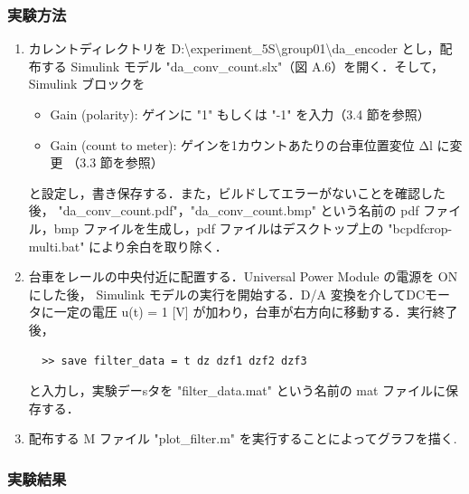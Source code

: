 \subsubsection{実験方法}
\begin{enumerate}
  \item カレントディレクトリを D:\textbackslash experiment\_5S\textbackslash group01\textbackslash da\_encoder とし，配布する Simulink モデル "da\_conv\_count.slx"（図 A.6）を開く．そして，Simulink ブロックを
        \begin{itemize}
          \item Gain (polarity): ゲインに "1" もしくは "-1" を入力（3.4 節を参照）
          \item Gain (count to meter): ゲインを1カウントあたりの台車位置変位 Δl に変更
                （3.3 節を参照）
        \end{itemize}
        
        と設定し，書き保存する．また，ビルドしてエラーがないことを確認した後，
        "da\_conv\_count.pdf"，"da\_conv\_count.bmp" という名前の 
        pdf ファイル，bmp ファイルを生成し，pdf ファイルはデスクトップ上の 
        "bcpdfcrop-multi.bat" により余白を取り除く．
        
  \item 台車をレールの中央付近に配置する．Universal Power Module の電源を ON にした後，
        Simulink モデルの実行を開始する．D/A 変換を介してDCモータに一定の電圧 
        u(t) = 1 [V] が加わり，台車が右方向に移動する．実行終了後，
        
        \begin{tcolorbox}[colback=gray!5!white,colframe=gray!75!black]
          \begin{lstlisting}
  >> save filter_data = t dz dzf1 dzf2 dzf3
  \end{lstlisting}
        \end{tcolorbox}
        
        と入力し，実験デーsタを "filter\_data.mat" という名前の mat ファイルに保存する．
        
  \item 配布する M ファイル "plot\_filter.m" を実行することによってグラフを描く.
\end{enumerate}

\subsubsection{実験結果}


